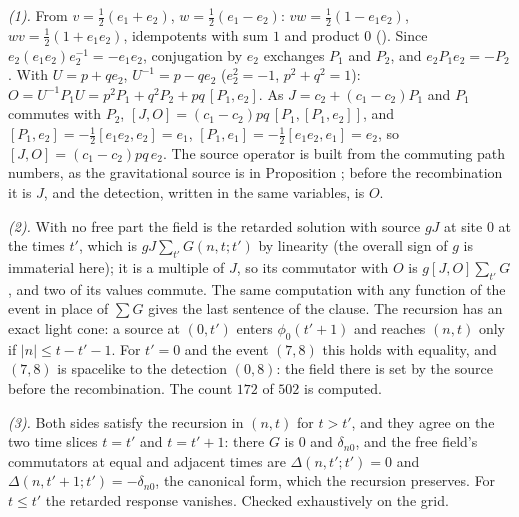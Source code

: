 \emph{(1).} From $v = \tfrac12(e_{1} + e_{2})$, $w = \tfrac12(e_{1} - e_{2})$: $vw = \tfrac12(1 - e_{1}e_{2})$, $wv = \tfrac12(1 + e_{1}e_{2})$, idempotents with sum $1$ and product $0$ (). Since $e_{2}(e_{1}e_{2})e_{2}^{-1} = -e_{1}e_{2}$, conjugation by $e_{2}$ exchanges $P_{1}$ and $P_{2}$, and $e_{2}P_{1}e_{2} = -P_{2}$. With $U = p + qe_{2}$, $U^{-1} = p - qe_{2}$ ($e_{2}^{2} = -1$, $p^{2} + q^{2} = 1$): $O = U^{-1}P_{1}U = p^{2}P_{1} + q^{2}P_{2} + pq\,[P_{1}, e_{2}]$. As $J = c_{2} + (c_{1} - c_{2})P_{1}$ and $P_{1}$ commutes with $P_{2}$, $[J, O] = (c_{1} - c_{2})pq\,[P_{1}, [P_{1}, e_{2}]]$, and $[P_{1}, e_{2}] = -\tfrac12[e_{1}e_{2}, e_{2}] = e_{1}$, $[P_{1}, e_{1}] = -\tfrac12[e_{1}e_{2}, e_{1}] = e_{2}$, so $[J, O] = (c_{1} - c_{2})pq\,e_{2}$. The source operator is built from the commuting path numbers, as the gravitational source is in Proposition ; before the recombination it is $J$, and the detection, written in the same variables, is $O$.

\emph{(2).} With no free part the field is the retarded solution with source $gJ$ at site $0$ at the times $t'$, which is $gJ\sum_{t'}G(n,t;t')$ by linearity (the overall sign of $g$ is immaterial here); it is a multiple of $J$, so its commutator with $O$ is $g[J,O]\sum_{t'}G$, and two of its values commute. The same computation with any function of the event in place of $\sum G$ gives the last sentence of the clause. The recursion has an exact light cone: a source at $(0,t')$ enters $\phi_{0}(t'+1)$ and reaches $(n,t)$ only if $|n| \le t - t' - 1$. For $t' = 0$ and the event $(7,8)$ this holds with equality, and $(7,8)$ is spacelike to the detection $(0,8)$: the field there is set by the source before the recombination. The count $172$ of $502$ is computed.

\emph{(3).} Both sides satisfy the recursion in $(n,t)$ for $t > t'$, and they agree on the two time slices $t = t'$ and $t = t' + 1$: there $G$ is $0$ and $\delta_{n0}$, and the free field's commutators at equal and adjacent times are $\Delta(n,t';t') = 0$ and $\Delta(n,t'+1;t') = -\delta_{n0}$, the canonical form, which the recursion preserves. For $t \le t'$ the retarded response vanishes. Checked exhaustively on the grid.

